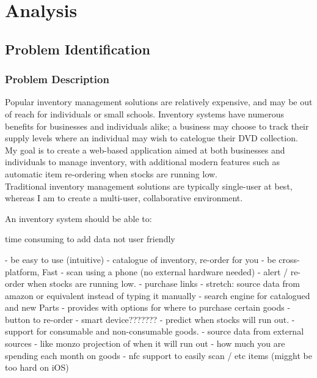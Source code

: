 \documentclass{article}
\title{\projectname}
\author{James Cahill}
\date{Sepetember 2023}
\begin{document}
\tableofcontents

\pagebreak

\section{Analysis}

\subsection{Problem Identification}

\subsubsection{Problem Description}

Popular inventory management solutions are relatively expensive, and may be out
of reach for individuals or small schools.
Inventory systems have numerous benefits for businesses and individuals alike; a business
may choose to track their supply levels where an individual may wish to catelogue their DVD collection. \\

\noindent My goal is to create a web-based application aimed at both businesses and individuals to manage
inventory, with additional modern features such as automatic item re-ordering when stocks are running low.\\

\noindent Traditional inventory management solutions are typically single-user at best, whereas I am to create
a multi-user, collaborative environment.


An inventory system should be able to:

time consuming to add data
not user friendly

- be easy to use (intuitive)
- catalogue of inventory, re-order for you
- be cross-platform, Fast
- scan using a phone (no external hardware needed)
- alert / re-order when stocks are running low.
- purchase links
- stretch: source data from amazon or equivalent instead of typing it manually
- search engine for catalogued and new Parts
    - provides with options for where to purchase certain goods
- button to re-order
    - smart device???????
- predict when stocks will run out.
- support for consumable and non-consumable goods.
- source data from external sources
- like monzo projection of when it will run out
- how much you are spending each month on goods
- nfc support to easily scan / etc items (migght be too hard on iOS)
\end{document}

